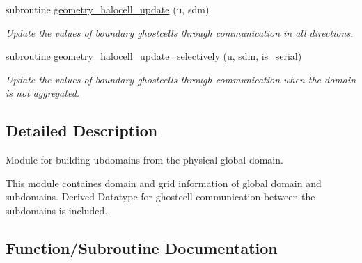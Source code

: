 \begin{DoxyCompactItemize}
subroutine \hyperlink{namespacegeometry_a28c9704c14f29b1f57c491246b206991}{geometry\+\_\+halocell\+\_\+update} (u, sdm)
\begin{DoxyCompactList}\small\item\em Update the values of boundary ghostcells through communication in all directions. \end{DoxyCompactList}\item 
subroutine \hyperlink{namespacegeometry_a13a9857b633f18041d764401c91d2918}{geometry\+\_\+halocell\+\_\+update\+\_\+selectively} (u, sdm, is\+\_\+serial)
\begin{DoxyCompactList}\small\item\em Update the values of boundary ghostcells through communication when the domain is not aggregated. \end{DoxyCompactList}\end{DoxyCompactItemize}


\subsection{Detailed Description}
Module for building ubdomains from the physical global domain. 

This module containes domain and grid information of global domain and subdomains. Derived Datatype for ghostcell communication between the subdomains is included. 

\subsection{Function/\+Subroutine Documentation}
\mbox{\label{namespacegeometry_a707b3bbf32a44b01c6a4f28e2be7d0fc}} 

